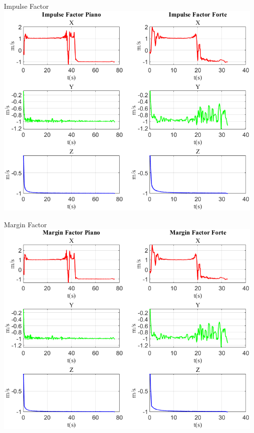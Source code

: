 	\begin{frame}{{Impulse Factor}}
		\centering\includegraphics[height=.8\textheight]{figure/Vel/Impulse Factor}
	\end{frame}
	
	\begin{frame}{{Margin Factor}}
		\centering\includegraphics[height=.8\textheight]{figure/Vel/Margin Factor}
	\end{frame}
	
